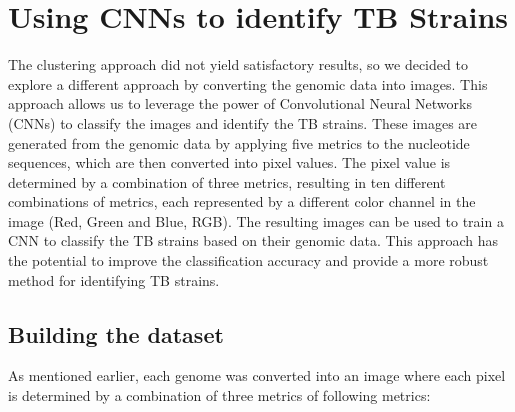 \chapter{Using CNNs to identify TB Strains}
\label{chap:cnn_tb_strains}

The clustering approach did not yield satisfactory results, so we decided to explore a different approach by converting the genomic
data into images. This approach allows us to leverage the power of Convolutional Neural Networks (CNNs) to classify the images and
identify the TB strains. These images are generated from the genomic data by applying five metrics to the nucleotide sequences,
which are then converted into pixel values. The pixel value is determined by a combination of three metrics, resulting in
ten different combinations of metrics, each represented by a different color channel in the image (Red, Green and Blue, RGB).
The resulting images can be used to train a CNN to classify the TB strains based on their genomic data. This approach has the
potential to improve the classification accuracy and provide a more robust method for identifying TB strains.

\section{Building the dataset}
\label{sec:building_dataset}

As mentioned earlier, each genome was converted into an image where each pixel is determined by a combination of three metrics of
following metrics:

